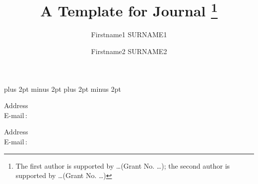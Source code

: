 \documentclass{amse}
\numberwithin{equation}{section} %
\begin{document}

\abovedisplayskip 6pt plus 2pt minus 2pt \belowdisplayskip 6pt
plus 2pt minus 2pt
\def\vsp{\vspace{1mm}}
\def\th#1{\vspace{1mm}\noindent{\bf #1}\quad}
\def\proof{\vspace{1mm}\noindent{\it Proof}\quad}
\def\no{\nonumber}
\newenvironment{prof}[1][Proof]{\noindent\textit{#1}\quad }
{\hfill $\Box$\vspace{0.7mm}}
\def\q{\quad} \def\qq{\qquad}
\allowdisplaybreaks[4]








\title{A Template for Journal        %
\footnote{The first author is supported by \ldots (Grant No. \ldots);
the second author is supported by \ldots (Grant No. \ldots)}}                  %

\author{Firstname1 \uppercase{Surname1}}             %
    {Address\\
    E-mail\,$:$ }

\author{Firstname2 SURNAME2}     %
    {Address\\
    E-mail\,$:$  }

\maketitle%


\end{document}
